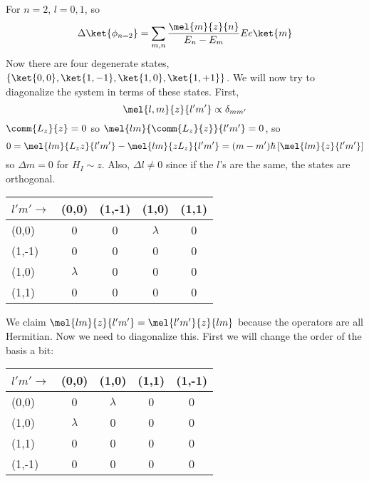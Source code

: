 \documentclass[a4paper,twoside,master.tex]{subfiles}
\begin{document}
For $ n = 2 $, $ l = 0,1 $, so
\begin{equation}
    \Delta \ket{\phi_{n=2}} = \sum_{m,n} \frac{\mel{m}{z}{n}}{E_n - E_m} Ee\ket{m}
\end{equation}
Now there are four degenerate states, $\{\ket{0,0},\ket{1, -1},\ket{1, 0},\ket{1,+1}\}$. We will now try to diagonalize the system in terms of these states. First,
\begin{equation}
    \mel{l,m}{z}{l'm'} \propto \delta_{mm'}
\end{equation}
$ \comm{L_z}{z} = 0 $ so $ \mel{lm}{\comm{L_z}{z}}{l'm'} = 0 $, so
\begin{equation}
    0 = \mel{lm}{L_z z}{l'm'} - \mel{lm}{zL_z}{l'm'} = (m-m') \hbar \left[ \mel{lm}{z}{l'm'} \right]
\end{equation}
so $ \Delta m = 0 $ for $ H_I \sim z $. Also, $ \Delta l \neq 0 $ since if the $ l $'s are the same, the states are orthogonal.
\begin{center}
\begin{tabular}{@{}l|cccc@{}}
        $ l'm' \rightarrow $ &(0,0)&(1,-1)&(1,0)&(1,1)\\
        \toprule
        (0,0)&0&0&$\lambda$&0\\
        \midrule
        (1,-1)&0&0&0&0\\
        \midrule
        (1,0)&$\lambda$&0&0&0\\
        \midrule
        (1,1)&0&0&0&0\\
    \bottomrule
\end{tabular}
\end{center}

We claim $ \mel{lm}{z}{l'm'} = \mel{l'm'}{z}{lm} $ because the operators are all Hermitian. Now we need to diagonalize this. First we will change the order of the basis a bit:

\begin{center}
\begin{tabular}{@{}l|cccc@{}}
        $ l'm' \rightarrow $ &(0,0)&(1,0)&(1,1)&(1,-1)\\
        \toprule
        (0,0)&0&$\lambda$&0&0\\
        \midrule
        (1,0)&$\lambda$&0&0&0\\
        \midrule
        (1,1)&0&0&0&0\\
        \midrule
        (1,-1)&0&0&0&0\\
    \bottomrule
\end{tabular}
\end{center}
\end{document}
